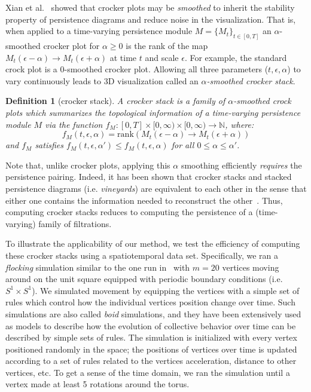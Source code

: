 \documentclass[sn-mathphys]{sn-jnl}
\newtheorem{definition}{Definition}
\begin{document}
Xian et al.~\cite{xian2020capturing} showed that crocker plots may be \emph{smoothed} to inherit the stability property of persistence diagrams and reduce noise in the visualization. That is, when applied to a time-varying persistence module $M = \{M_t\}_{t \in [0, T]}$ an $\alpha$-smoothed crocker plot for $\alpha \geq 0$ is the rank of the map $M_t(\epsilon - \alpha) \to M_t(\epsilon + \alpha)$ at time $t$ and scale $\epsilon$. For example, the standard crock plot is a $0$-smoothed crocker plot. Allowing all three parameters ($t, \epsilon, \alpha$) to vary continuously leads to 3D visualization called an $\alpha$\emph{-smoothed crocker stack}.
\begin{definition}[crocker stack]
	A crocker stack is a family of $\alpha$-smoothed crock plots which summarizes the topological information of a time-varying persistence module $M$ via the function $f_M : [0, T] \times [0, \infty) \times [0, \infty) \to \mathbb{N}$, where:
	$$ f_M(t,\epsilon, \alpha) = \mathrm{rank}(M_t(\epsilon - \alpha) \to M_t(\epsilon + \alpha)) $$
	and $f_M$ satisfies $f_M(t,\epsilon,\alpha') \leq f_M(t,\epsilon, \alpha)$ for all $0 \leq \alpha \leq \alpha'$.
\end{definition}
\noindent Note that, unlike crocker plots, applying this $\alpha$ smoothing efficiently \emph{requires} the persistence pairing. Indeed, it has been shown that crocker stacks and stacked persistence diagrams (i.e. \emph{vineyards}) are equivalent to each other in the sense that either one contains the information needed to reconstruct the other~\cite{xian2020capturing}. Thus, computing crocker stacks reduces to computing the persistence of a (time-varying) family of filtrations.


To illustrate the applicability of our method, we test the efficiency of computing these crocker stacks using a spatiotemporal data set. Specifically, we ran a \emph{flocking} simulation similar to the one run in~\cite{topaz2015topological} with $m = 20$ vertices moving around on the unit square equipped with periodic boundary conditions (i.e. $S^1 \times S^1$). We simulated movement by equipping the vertices with a simple set of rules which control how the individual vertices position change over time. Such simulations are also called \emph{boid} simulations, and they have been extensively used as models to describe how the evolution of collective behavior over time can be described by simple sets of rules.
The simulation is initialized with every vertex positioned randomly in the space; the positions of vertices over time is updated according to a set of rules related to the vertices acceleration, distance to other vertices, etc. To get a sense of the time domain, we ran the simulation until a vertex made at least 5 rotations around the torus. 
\end{document}

